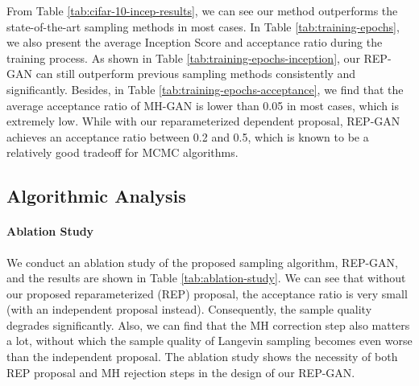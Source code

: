 \documentclass[runningheads]{llncs}
\newcommand{\<}{\left\langle}
\renewcommand{\>}{\right\rangle}
\begin{document}
\begin{table}[t]\centering
    \caption{Ablation study of our REP-GAN with 
    Inception Scores (IS) and acceptance ratios on CIFAR-10 with two backbone models, DCGAN and WGAN.
    }
    \label{tab:ablation-study}

\end{table}


From Table \ref{tab:cifar-10-incep-results}, we can see our method  outperforms the state-of-the-art sampling methods in most cases. 
In Table \ref{tab:training-epochs}, we also present the average Inception Score and acceptance ratio during the training process.
As shown in Table \ref{tab:training-epochs-inception}, our REP-GAN can still outperform previous sampling methods consistently and significantly. Besides, in Table \ref{tab:training-epochs-acceptance}, we find that the average acceptance ratio of MH-GAN is lower than 0.05 in most cases, which is extremely low. While with our reparameterized dependent proposal, REP-GAN achieves an acceptance ratio between 0.2 and 0.5, which is known to be a relatively good tradeoff for MCMC algorithms.

\subsection{Algorithmic Analysis}

\paragraph{\textbf{Ablation Study}} We conduct an ablation study of the proposed sampling algorithm, REP-GAN, and  the results are shown in Table \ref{tab:ablation-study}.  We can see that without our proposed reparameterized (REP) proposal, the acceptance ratio is very small (with an independent proposal instead). Consequently, the sample quality degrades significantly. Also, we can find that the MH correction step also matters a lot, without which the sample quality of Langevin sampling becomes even worse than the independent proposal. The ablation study shows the necessity of both REP proposal and MH rejection steps in the design of our REP-GAN.
\end{document}
